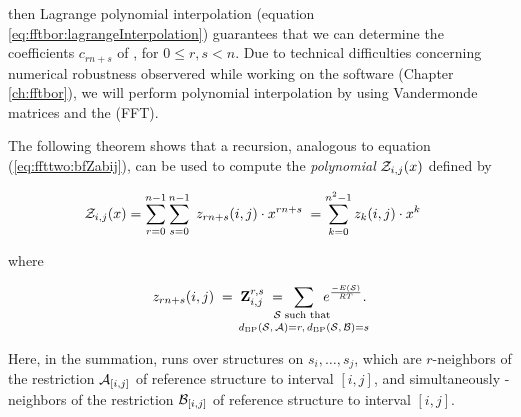 then Lagrange polynomial interpolation
(equation \ref{eq:fftbor:lagrangeInterpolation})
guarantees that we can determine the coefficients $c_{rn+s}$ of \emZ{},
for $0 \leq r,s < n$. Due to technical difficulties concerning numerical
robustness observered while working on the \fftbor software
(Chapter \ref{ch:fftbor}), we will perform polynomial interpolation
by using Vandermonde matrices and the \fft (FFT).

The following theorem shows that a
recursion, analogous to equation (\ref{eq:ffttwo:bfZabij}),
can be used to compute
the {\em polynomial} ${\mathcal Z}_{i,j}(x)$ defined by

\begin{align}
\label{eq:ffttwo:emZij}
\emZ{i,j} &= \sum_{r=0}^{n-1} \sum_{s=0}^{n-1}\;
z_{rn+s}(i,j) \cdot x^{rn+s}\; =
\sum_{k=0}^{n^2-1} z_{k}(i,j) \cdot x^{k}
\end{align}

where

\begin{align}
z_{rn+s}(i,j) \;=\; \bfZ{r,s}{i,j}\;=
\enspace\sum_{\mathclap{\substack{
\str \text{ such that } \rule[-.5ex]{0pt}{0pt} \\
\dBP{\str}{\strA} = r,\,\dBP{\str}{\strB} = s
}}}\enspace
\boltzF{\str}.
\end{align}

Here, in the summation, \str runs over structures on $s_i,\dots,s_j$, which
are $r$-neighbors of the restriction $\mathcal A_{[i,j]}$ of reference structure
\strA to interval $[i,j]$, and simultaneously
\str-neighbors of the restriction $\mathcal B_{[i,j]}$ of reference structure
\strB to interval $[i,j]$.

